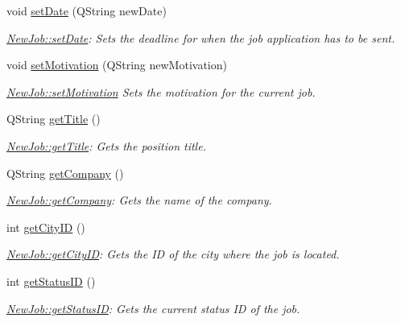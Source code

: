 \begin{DoxyCompactItemize}
void \hyperlink{class_new_job_a0a1d9067e72f797ad3b1f01d44fedb0f}{set\+Date} (Q\+String new\+Date)
\begin{DoxyCompactList}\small\item\em \hyperlink{class_new_job_a0a1d9067e72f797ad3b1f01d44fedb0f}{New\+Job\+::set\+Date}\+: Sets the deadline for when the job application has to be sent. \end{DoxyCompactList}\item 
void \hyperlink{class_new_job_a3ddb9ee8bccdf069711406effb9d7dcd}{set\+Motivation} (Q\+String new\+Motivation)
\begin{DoxyCompactList}\small\item\em \hyperlink{class_new_job_a3ddb9ee8bccdf069711406effb9d7dcd}{New\+Job\+::set\+Motivation} Sets the motivation for the current job. \end{DoxyCompactList}\item 
Q\+String \hyperlink{class_new_job_aa93c07712d80644b828994a01993c27c}{get\+Title} ()
\begin{DoxyCompactList}\small\item\em \hyperlink{class_new_job_aa93c07712d80644b828994a01993c27c}{New\+Job\+::get\+Title}\+: Gets the position title. \end{DoxyCompactList}\item 
Q\+String \hyperlink{class_new_job_ad4680ae9c009b90ce751c3c5fe60cdb5}{get\+Company} ()
\begin{DoxyCompactList}\small\item\em \hyperlink{class_new_job_ad4680ae9c009b90ce751c3c5fe60cdb5}{New\+Job\+::get\+Company}\+: Gets the name of the company. \end{DoxyCompactList}\item 
int \hyperlink{class_new_job_aed4a9a6fa7eab69062c1d36afd58cd75}{get\+City\+ID} ()
\begin{DoxyCompactList}\small\item\em \hyperlink{class_new_job_aed4a9a6fa7eab69062c1d36afd58cd75}{New\+Job\+::get\+City\+ID}\+: Gets the ID of the city where the job is located. \end{DoxyCompactList}\item 
int \hyperlink{class_new_job_aebbe015a22f5dbf60a34c33dd5c5a8e7}{get\+Status\+ID} ()
\begin{DoxyCompactList}\small\item\em \hyperlink{class_new_job_aebbe015a22f5dbf60a34c33dd5c5a8e7}{New\+Job\+::get\+Status\+ID}\+: Gets the current status ID of the job. \end{DoxyCompactList}\item 

\end{DoxyCompactItemize}
